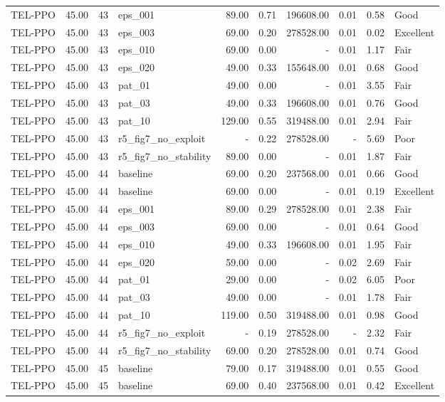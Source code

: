 \begin{table}[htbp]
\begin{tabular}{lrrlrrrrrl}
TEL-PPO & 45.00 & 43 & eps_001 & 89.00 & 0.71 & 196608.00 & 0.01 & 0.58 & Good \\
TEL-PPO & 45.00 & 43 & eps_003 & 69.00 & 0.20 & 278528.00 & 0.01 & 0.02 & Excellent \\
TEL-PPO & 45.00 & 43 & eps_010 & 69.00 & 0.00 & - & 0.01 & 1.17 & Fair \\
TEL-PPO & 45.00 & 43 & eps_020 & 49.00 & 0.33 & 155648.00 & 0.01 & 0.68 & Good \\
TEL-PPO & 45.00 & 43 & pat_01 & 49.00 & 0.00 & - & 0.01 & 3.55 & Fair \\
TEL-PPO & 45.00 & 43 & pat_03 & 49.00 & 0.33 & 196608.00 & 0.01 & 0.76 & Good \\
TEL-PPO & 45.00 & 43 & pat_10 & 129.00 & 0.55 & 319488.00 & 0.01 & 2.94 & Fair \\
TEL-PPO & 45.00 & 43 & r5_fig7_no_exploit & - & 0.22 & 278528.00 & - & 5.69 & Poor \\
TEL-PPO & 45.00 & 43 & r5_fig7_no_stability & 89.00 & 0.00 & - & 0.01 & 1.87 & Fair \\
TEL-PPO & 45.00 & 44 & baseline & 69.00 & 0.20 & 237568.00 & 0.01 & 0.66 & Good \\
TEL-PPO & 45.00 & 44 & baseline & 69.00 & 0.00 & - & 0.01 & 0.19 & Excellent \\
TEL-PPO & 45.00 & 44 & eps_001 & 89.00 & 0.29 & 278528.00 & 0.01 & 2.38 & Fair \\
TEL-PPO & 45.00 & 44 & eps_003 & 69.00 & 0.00 & - & 0.01 & 0.64 & Good \\
TEL-PPO & 45.00 & 44 & eps_010 & 49.00 & 0.33 & 196608.00 & 0.01 & 1.95 & Fair \\
TEL-PPO & 45.00 & 44 & eps_020 & 59.00 & 0.00 & - & 0.02 & 2.69 & Fair \\
TEL-PPO & 45.00 & 44 & pat_01 & 29.00 & 0.00 & - & 0.02 & 6.05 & Poor \\
TEL-PPO & 45.00 & 44 & pat_03 & 49.00 & 0.00 & - & 0.01 & 1.78 & Fair \\
TEL-PPO & 45.00 & 44 & pat_10 & 119.00 & 0.50 & 319488.00 & 0.01 & 0.98 & Good \\
TEL-PPO & 45.00 & 44 & r5_fig7_no_exploit & - & 0.19 & 278528.00 & - & 2.32 & Fair \\
TEL-PPO & 45.00 & 44 & r5_fig7_no_stability & 69.00 & 0.20 & 278528.00 & 0.01 & 0.74 & Good \\
TEL-PPO & 45.00 & 45 & baseline & 79.00 & 0.17 & 319488.00 & 0.01 & 0.55 & Good \\
TEL-PPO & 45.00 & 45 & baseline & 69.00 & 0.40 & 237568.00 & 0.01 & 0.42 & Excellent \\

\end{tabular}
\end{table}
